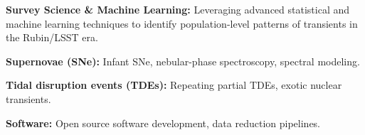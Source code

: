 


\begin{cvpubs}


\cvpub
{ %
\begin{cvitems}
    \item \textbf{\color{darktext}Survey Science \& Machine Learning:} Leveraging advanced statistical and machine learning techniques to identify population-level patterns of transients in the Rubin/LSST era.
    \item \textbf{\color{darktext}Supernovae (SNe):} Infant SNe, nebular-phase spectroscopy, spectral modeling.
    \item \textbf{\color{darktext}Tidal disruption events (TDEs):} Repeating partial TDEs, exotic nuclear transients.
    \item \textbf{\color{darktext}Software:} Open source software development, data reduction pipelines.
\end{cvitems}
}


\end{cvpubs}